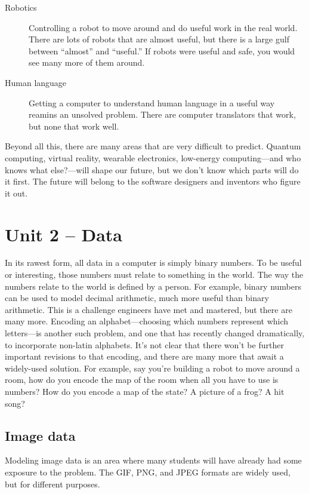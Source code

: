 \documentclass[11pt]{article}
\begin{document}
\begin{description}
\item[Robotics] Controlling a robot to move around and do useful work
  in the real world.  There are lots of robots that are almost useful,
  but there is a large gulf between ``almost'' and ``useful.''  If
  robots were useful and safe, you would see many more of them around.

\item[Human language] Getting a computer to understand human language
  in a useful way reamins an unsolved problem.  There are computer
  translators that work, but none that work well.

\end{description}

Beyond all this, there are many areas that are very difficult to
predict.  Quantum computing, virtual reality, wearable electronics,
low-energy computing---and who knows what else?---will shape our
future, but we don't know which parts will do it first.  The future
will belong to the software designers and inventors who figure it out.


\section{Unit 2 -- Data}

In its rawest form, all data in a computer is simply binary numbers.
To be useful or interesting, those numbers must relate to something in
the world.  The way the numbers relate to the world is defined by a
person.  For example, binary numbers can be used to model decimal
arithmetic, much more useful than binary arithmetic.  This is a
challenge engineers have met and mastered, but there are many more.
Encoding an alphabet---choosing which numbers represent which
letters---is another such problem, and one that has recently changed
dramatically, to incorporate non-latin alphabets.  It's not clear that
there won't be further important revisions to that encoding, and there
are many more that await a widely-used solution.  For example, say
you're building a robot to move around a room, how do you encode the
map of the room when all you have to use is numbers?  How do you
encode a map of the state?  A picture of a frog?  A hit song?


\subsection{Image data}

Modeling image data is an area where many students will have already
had some exposure to the problem.  The GIF, PNG, and JPEG formats are
widely used, but for different purposes.
\end{document}
